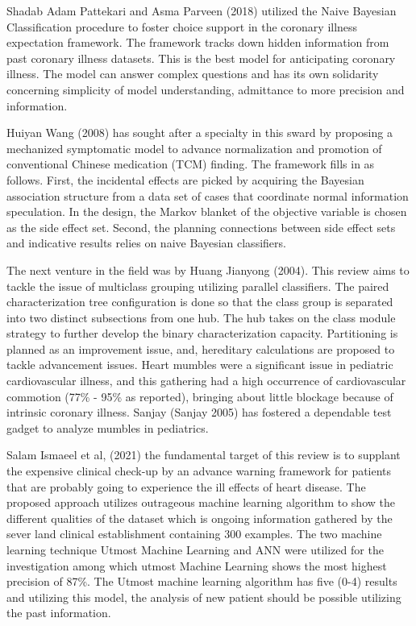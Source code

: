 Shadab Adam Pattekari and Asma Parveen (2018) utilized the Naive Bayesian Classification procedure to foster choice support in the coronary illness expectation framework. The framework tracks down hidden information from past coronary illness datasets. This is the best model for anticipating coronary illness. The model can answer complex questions and has its own solidarity concerning simplicity of model understanding, admittance to more precision  and information.

Huiyan Wang (2008) has sought after a specialty in this sward by proposing a mechanized symptomatic model to advance normalization and promotion of conventional Chinese medication (TCM) finding. The framework fills in as follows. First, the incidental effects are picked by acquiring the Bayesian association structure from a data set of cases that coordinate normal information speculation. In the design, the Markov blanket of the objective variable is chosen as the side effect set. Second, the planning connections between side effect sets and indicative results relies on naive Bayesian classifiers.

The next venture in the field was by Huang Jianyong (2004). This review aims to tackle the issue of multiclass grouping utilizing parallel classifiers. The paired characterization tree configuration is done so that the class group is separated into two distinct subsections from one hub. The hub takes on the class module strategy to further develop the binary characterization capacity. Partitioning is planned as an improvement issue, and, hereditary calculations are proposed to tackle advancement issues. Heart mumbles were a significant issue in pediatric cardiovascular illness, and this gathering  had a high occurrence of cardiovascular commotion (77\% - 95\% as reported), bringing about little blockage because of intrinsic coronary illness. Sanjay (Sanjay 2005) has fostered a dependable test gadget to analyze mumbles in pediatrics.


Salam Ismaeel et al, (2021) the fundamental target of this review is to supplant the expensive clinical check-up by an advance warning framework for patients that are probably going to experience the ill effects of heart disease. The proposed approach utilizes outrageous machine learning algorithm to show the different qualities of the dataset which is ongoing information gathered by the sever land clinical establishment containing 300 examples. The two machine learning technique Utmost Machine Learning and ANN were utilized for the investigation among which utmost Machine Learning shows the most highest precision of 87\%. The Utmost machine learning algorithm has five (0-4) results and utilizing this model, the analysis of new patient should be possible utilizing the past information.

